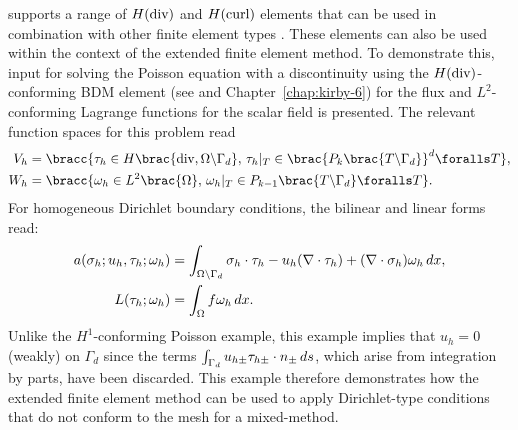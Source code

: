 \ffc{} supports a range of $H(\rm div)$ and $H(\rm curl)$ elements
that can be used in combination with other finite element types
\citep{RognesKirbyLogg2009}. These elements can also be used within the
context of the extended finite element method. To demonstrate this, \ufl{}
input for solving the Poisson equation with a discontinuity using the
$H(\rm div)$-conforming BDM element (see \citet{BrezziDouglasMarini1985}
and Chapter~\ref{chap:kirby-6}) for the flux and $L^{2}$-conforming Lagrange
functions for the scalar field is presented.  The relevant function
spaces for this problem read
%
\begin{align}
  V_{h} &= \bracc{\vect{\tau}_{h} \in H\brac{{\rm div}, \Omega\backslash\Gamma_{d}}, \,
         \vect{\tau}_{h}|_{T} \in \brac{P_{k}\brac{T \backslash \Gamma_{d}}}^{d} \foralls T},
\label{eqn:nikbakht:BDM_space}
\\
  W_{h} &= \bracc{\omega_{h} \in L^{2}\brac{\Omega}, \,
         \omega_{h}|_{T} \in P_{k-1}\brac{T \backslash \Gamma_{d}}\foralls T}.
\label{eqn:nikbakht:DG_space}
\end{align}
%
For homogeneous Dirichlet boundary conditions, the bilinear and linear
forms read:
%
\begin{align}
  a(\sigma_{h}; u_{h}, \tau_{h}; \omega_{h})
    &= \int_{\Omega\backslash\Gamma_{d}} \sigma_{h} \cdot  \tau_{h}
        - u_{h} (\nabla \cdot \tau_{h}) + (\nabla \cdot \sigma_{h}) \omega_{h} \, d x,
\\
  L(\tau_{h}; \omega_{h}) &= \int_{\Omega} f \omega_{h}  \, d x.
\end{align}
%
Unlike the $H^{1}$-conforming Poisson example, this example implies that
$u_{h} = 0$ (weakly) on $\Gamma_{d}$ since the terms $\int_{\Gamma_{d}}
u_{h\pm} \tau_{h\pm} \cdot n_{\pm} \, d s$, which arise
from integration by parts, have been discarded.  This example therefore
demonstrates how the extended finite element method can be used to
apply Dirichlet-type conditions that do not conform to the mesh for
a mixed-method.

